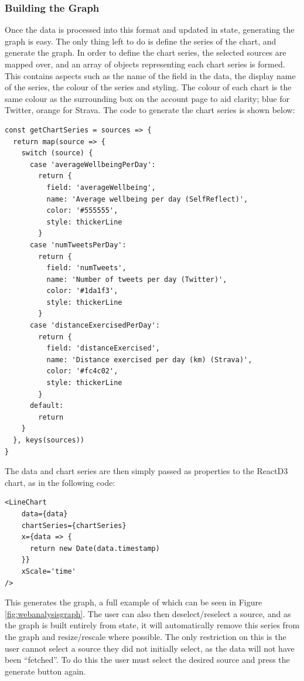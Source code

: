 \documentclass[11pt,openright,a4paper]{report}
\begin{document}
\subsubsection{Building the Graph}
Once the data is processed into this format and updated in state, generating the graph is easy. The only thing left to do is define the series of the chart, and generate the graph. In order to define the chart series, the selected sources are mapped over, and an array of objects representing each chart series is formed. This contains aspects such as the name of the field in the data, the display name of the series, the colour of the series and styling. The colour of each chart is the same colour as the surrounding box on the account page to aid clarity; blue for Twitter, orange for Strava. The code to generate the chart series is shown below:
\begin{lstlisting}
const getChartSeries = sources => {
  return map(source => {
    switch (source) {
      case 'averageWellbeingPerDay':
        return {
          field: 'averageWellbeing',
          name: 'Average wellbeing per day (SelfReflect)',
          color: '#555555',
          style: thickerLine
        }
      case 'numTweetsPerDay':
        return {
          field: 'numTweets',
          name: 'Number of tweets per day (Twitter)',
          color: '#1da1f3',
          style: thickerLine
        }
      case 'distanceExercisedPerDay':
        return {
          field: 'distanceExercised',
          name: 'Distance exercised per day (km) (Strava)',
          color: '#fc4c02',
          style: thickerLine
        }
      default:
        return
    }
  }, keys(sources))
}
\end{lstlisting}

The data and chart series are then simply passed as properties to the ReactD3 chart, as in the following code:
\begin{lstlisting}
<LineChart
    data={data}
    chartSeries={chartSeries}
    x={data => {
      return new Date(data.timestamp)
    }}
    xScale='time'
/>
\end{lstlisting}

This generates the graph, a full example of which can be seen in Figure \ref{fig:webanalysisgraph}. The user can also then deselect/reselect a source, and as the graph is built entirely from state, it will automatically remove this series from the graph and resize/rescale where possible. The only restriction on this is the user cannot select a source they did not initially select, as the data will not have been \enquote{fetched}. To do this the user must select the desired source and press the generate button again.
\end{document}

